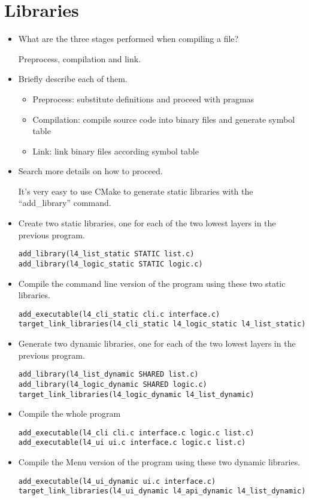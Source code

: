 \documentclass{article}
\begin{document}
\section{Libraries}
\begin{itemize}
\item What are the three stages performed when compiling a file?

Preprocess, compilation and link.

\item Briefly describe each of them.
\begin{itemize}
\item Preprocess: substitute definitions and proceed with pragmas
\item Compilation: compile source code into binary files and generate symbol table
\item Link: link binary files according symbol table
\end{itemize}

\item Search more details on how to proceed.

It's very easy to use CMake to generate static libraries with the ``add\_library'' command.

\item Create two static libraries, one for each of the two lowest layers in the previous program.
\begin{verbatim}
add_library(l4_list_static STATIC list.c)
add_library(l4_logic_static STATIC logic.c)
\end{verbatim}

\item Compile the command line version of the program using these two static libraries.
\begin{verbatim}
add_executable(l4_cli_static cli.c interface.c)
target_link_libraries(l4_cli_static l4_logic_static l4_list_static)
\end{verbatim}

\item Generate two dynamic libraries, one for each of the two lowest layers in the previous program.
\begin{verbatim}
add_library(l4_list_dynamic SHARED list.c)
add_library(l4_logic_dynamic SHARED logic.c)
target_link_libraries(l4_logic_dynamic l4_list_dynamic)
\end{verbatim}

\item Compile the whole program
\begin{verbatim}
add_executable(l4_cli cli.c interface.c logic.c list.c)
add_executable(l4_ui ui.c interface.c logic.c list.c)
\end{verbatim}

\item Compile the Menu version of the program using these two dynamic libraries.
\begin{verbatim}
add_executable(l4_ui_dynamic ui.c interface.c)
target_link_libraries(l4_ui_dynamic l4_api_dynamic l4_list_dynamic)
\end{verbatim}

\end{itemize}
\end{document}
